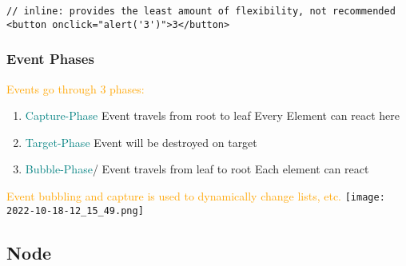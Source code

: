 \documentclass[main.tex,fontsize=6pt,paper=a4,paper=landscape,DIV=calc,]{scrartcl}
\begin{document}
\begin{multicols*}{4}
\begin{lstlisting}
// inline: provides the least amount of flexibility, not recommended
<button onclick="alert('3')">3</button>
\end{lstlisting}
\vspace{2mm}

\subsubsection{Event Phases} 
\textcolor{orange}{Events go through 3 phases:}\newline
\begin{enumerate}
  \item \textcolor{teal}{Capture-Phase}\newline
    Event travels from root to leaf\newline
    Every Element can react here
  \item \textcolor{teal}{Target-Phase}\newline
    Event will be destroyed on target
  \item \textcolor{teal}{Bubble-Phase}\newline/
    Event travels from leaf to root\newline
    Each element can react
\end{enumerate}
\vspace{2mm}
\textcolor{orange}{Event bubbling and capture is used to dynamically change lists, etc.}
\texttt{[image: 2022-10-18-12\_15\_49.png]}

\subsection{Node}


\end{multicols*}
\end{document}
